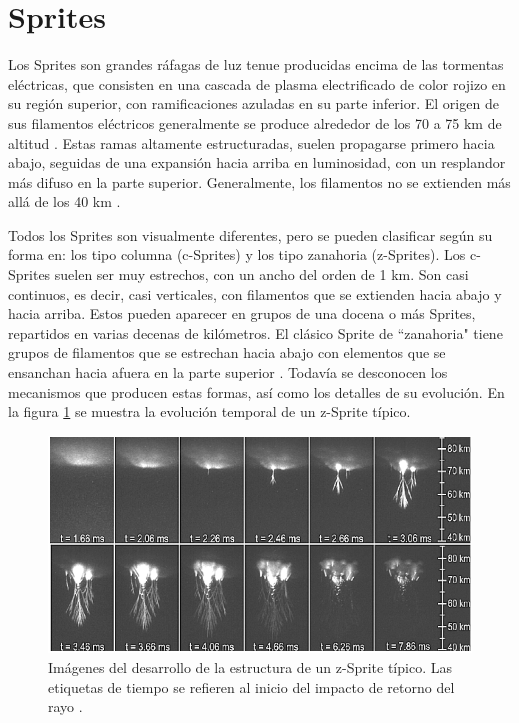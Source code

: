 \documentclass[12pt,oneside,openany,letter]{book}
\begin{document}
\section{Sprites} 
Los Sprites son grandes ráfagas de luz tenue producidas encima de las tormentas eléctricas, que consisten en una cascada de plasma electrificado de color rojizo en su región superior, con ramificaciones azuladas en su parte inferior. El origen de sus filamentos eléctricos generalmente se produce alrededor de los 70 a 75 km de altitud \cite{FullekrugEtal2006}. Estas ramas altamente estructuradas, suelen propagarse primero hacia abajo, seguidas de una expansión hacia arriba en luminosidad, con un resplandor más difuso en la parte superior. Generalmente, los filamentos no se extienden más allá de los 40 km \cite{FullekrugEtal2006}. 

Todos los Sprites son visualmente diferentes, pero se pueden clasificar según su forma en: los tipo columna (c-Sprites) y los tipo zanahoria (z-Sprites). Los c-Sprites suelen ser muy estrechos, con un ancho del orden de 1 km. Son casi continuos, es decir, casi verticales, con filamentos que se extienden hacia abajo y hacia arriba. Estos pueden aparecer en grupos de una docena o más Sprites, repartidos en varias decenas de kilómetros. El clásico Sprite de ``zanahoria" tiene grupos de filamentos que se estrechan hacia abajo con elementos que se ensanchan hacia afuera en la parte superior \cite{FullekrugEtal2006}. Todavía se desconocen los mecanismos que producen estas formas, así como los detalles de su evolución. En la figura \ref{fig:sprite_evolution} se muestra la evolución temporal de un z-Sprite típico.

\begin{figure}[h!]
    \centering
    \includegraphics[scale=0.8]{figures/sprite_evolution2.png}
    \caption[Evolución temporal de un Sprite]{Imágenes del desarrollo de la estructura de un z-Sprite típico. Las etiquetas de tiempo se refieren al inicio del impacto de retorno del rayo \cite{CummerEtal2006}.}
    \label{fig:sprite_evolution}
\end{figure}
\end{document}
